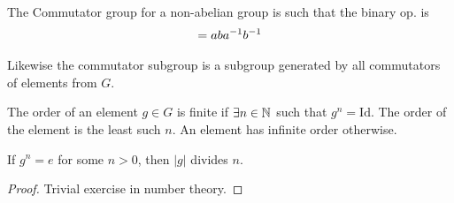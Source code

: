 \documentclass[12pt, twosided]{article}
\begin{document}
  \begin{exa}
    The Commutator group for a non-abelian group is such that the binary op. is
    \begin{align*}
      [a, b] = aba\1b\1
    \end{align*}

    Likewise the commutator subgroup is a subgroup generated by all commutators of elements from \(G\).
  \end{exa}

  \begin{df}
    The order of an element \(g \in G\) is finite if \(\exists n \in \mathbb{N}\) such that \(g^n = \mathrm{Id}\). The order of the element is the least such \(n\). An element has infinite order otherwise.
  \end{df}

  \begin{lm}
    If \(g^n = e\) for some \(n > 0\), then \(|g|\) divides \(n\).
  \end{lm}
  \begin{proof}
    Trivial exercise in number theory.
  \end{proof}
\end{document}
